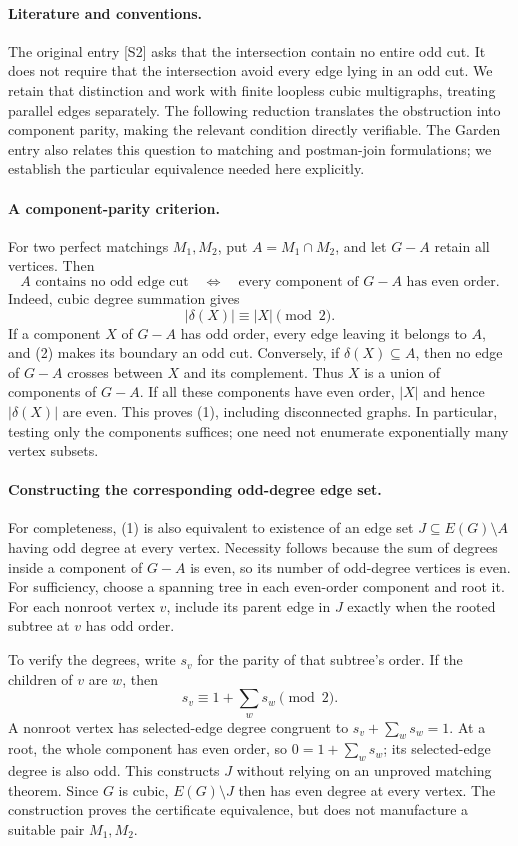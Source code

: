 \documentclass[11pt,a4paper]{article}
\begin{document}
\paragraph{Literature and conventions.}
The original entry [S2] asks that the intersection contain no entire odd cut. It does not require that the intersection avoid every edge lying in an odd cut. We retain that distinction and work with finite loopless cubic multigraphs, treating parallel edges separately. The following reduction translates the obstruction into component parity, making the relevant condition directly verifiable. The Garden entry also relates this question to matching and postman-join formulations; we establish the particular equivalence needed here explicitly.

\paragraph{A component-parity criterion.}
For two perfect matchings $M_1,M_2$, put $A=M_1\cap M_2$, and let $G-A$ retain all vertices. Then
\[
 A\text{ contains no odd edge cut}
 \quad\Longleftrightarrow\quad
 \text{every component of }G-A\text{ has even order}. \tag{1}
\]
Indeed, cubic degree summation gives
\[
 |\delta(X)|\equiv |X|\pmod2. \tag{2}
\]
If a component $X$ of $G-A$ has odd order, every edge leaving it belongs to $A$, and (2) makes its boundary an odd cut. Conversely, if $\delta(X)\subseteq A$, then no edge of $G-A$ crosses between $X$ and its complement. Thus $X$ is a union of components of $G-A$. If all these components have even order, $|X|$ and hence $|\delta(X)|$ are even. This proves (1), including disconnected graphs. In particular, testing only the components suffices; one need not enumerate exponentially many vertex subsets.

\paragraph{Constructing the corresponding odd-degree edge set.}
For completeness, (1) is also equivalent to existence of an edge set $J\subseteq E(G)\setminus A$ having odd degree at every vertex. Necessity follows because the sum of degrees inside a component of $G-A$ is even, so its number of odd-degree vertices is even. For sufficiency, choose a spanning tree in each even-order component and root it. For each nonroot vertex $v$, include its parent edge in $J$ exactly when the rooted subtree at $v$ has odd order.

To verify the degrees, write $s_v$ for the parity of that subtree's order. If the children of $v$ are $w$, then
\[
 s_v\equiv1+\sum_w s_w\pmod2.
\]
A nonroot vertex has selected-edge degree congruent to $s_v+\sum_w s_w=1$. At a root, the whole component has even order, so $0=1+\sum_w s_w$; its selected-edge degree is also odd. This constructs $J$ without relying on an unproved matching theorem. Since $G$ is cubic, $E(G)\setminus J$ then has even degree at every vertex. The construction proves the certificate equivalence, but does not manufacture a suitable pair $M_1,M_2$.
\end{document}
